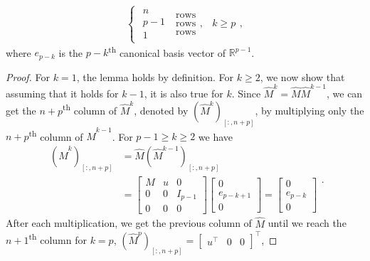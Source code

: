 \begin{mdframed}
\begin{lemma}
\begin{equation*}
\begin{cases}
                \begin{matrix} n \\ p-1 \\ 1 \end{matrix}
                \; \begin{matrix} \text{rows} \\ \text{rows} \\ \text{rows} \end{matrix},
                & k \ge p
            \end{cases},
        \end{equation*}
        where $e_{p-k}$ is the $p-k$\textsuperscript{th} canonical basis vector of $\mathbb{R}^{p-1}$.
    \end{lemma}
\end{mdframed}
\begin{proof}
    For $k=1$, the lemma holds by definition. For $k \ge 2$, we now show that assuming
    that it holds for $k-1$, it is also true for $k$.
    Since $\hat{M}^k = \hat{M} \hat{M}^{k-1}$, we can get the $n+p$\textsuperscript{th}
    column of $\hat{M}^k$, denoted by $(\hat{M}^k)_{[:, n+p]}$, by multiplying only
    the $n+p$\textsuperscript{th} column of $\hat{M}^{k-1}$.
    For $p-1 \ge k \ge 2$ we have
    \begin{equation*}
        \begin{aligned}
            (\hat{M}^k)_{[:, n+p]} & = \hat{M} (\hat{M}^{k-1})_{[:, n+p]} \\
            & =
            \begin{bmatrix} M & u & 0\\ 0 & 0 & I_{p-1}\\ 0 & 0 & 0 \end{bmatrix}
            \begin{bmatrix} 0 \\ e_{p-k+1} \\ 0 \end{bmatrix}
            =
            \begin{bmatrix} 0 \\ e_{p-k} \\ 0 \end{bmatrix}
        \end{aligned}.
    \end{equation*}
    After each multiplication, we get the previous column of $\hat{M}$ until we reach
    the $n+1$\textsuperscript{th} column for $k=p$,
    $(\hat{M}^p)_{[:, n+p]} = \begin{bmatrix}u^\top & 0 & 0\end{bmatrix}^\top$,

\end{proof}
